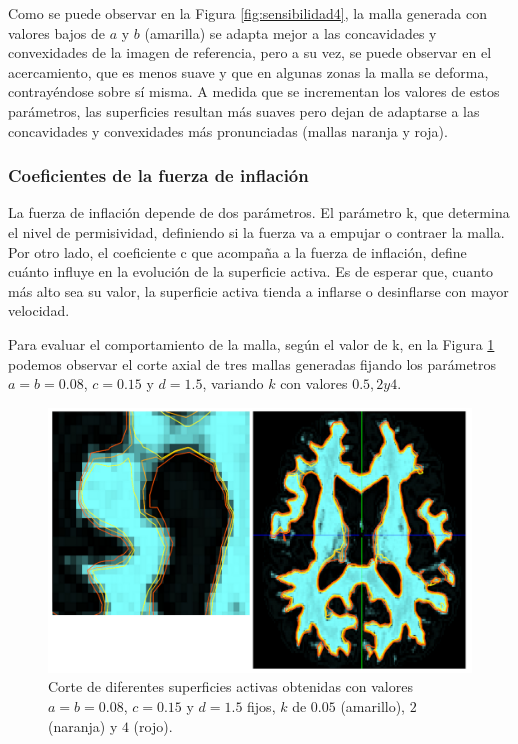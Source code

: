 Como se puede observar en la Figura \ref{fig:sensibilidad4}, la malla generada con valores bajos de $a$ y $b$ (amarilla) se adapta mejor a las concavidades y convexidades de la imagen de referencia, pero a su vez, se puede observar en el acercamiento, que es menos suave y que en algunas zonas la malla se deforma, contrayéndose sobre sí misma. A medida que se incrementan los valores de estos parámetros, las superficies resultan más suaves pero dejan de adaptarse a las concavidades y convexidades más pronunciadas (mallas naranja y roja). 

\subsubsection{Coeficientes de la fuerza de inflación}
La fuerza de inflación depende de dos parámetros. El parámetro k, que determina el nivel de permisividad, definiendo si la fuerza va a empujar o contraer la malla. Por otro lado,  el coeficiente c que acompaña a la fuerza de inflación, define  cuánto influye en la evolución de la superficie activa. Es de esperar que, cuanto más alto sea su valor, la superficie activa tienda a inflarse o desinflarse con mayor velocidad.

Para evaluar el comportamiento de la malla, según el valor de k, en la Figura \ref{fig:sensibilidad8} podemos observar el corte axial de tres mallas generadas fijando los parámetros $a=b=0.08$, $c=0.15$ y $d=1.5$, variando $k$ con valores $0.5, 2 y 4$.

\begin{figure}[H]
	\centering
	\includegraphics[scale=0.05]{images/sensibilidad8.jpg}
	\caption{Corte de diferentes superficies activas obtenidas con valores $a=b=0.08$, $c=0.15$ y $d=1.5$ fijos,  $k$ de $0.05$ (amarillo), $2$ (naranja) y $4$ (rojo). }
	\label{fig:sensibilidad8}
\end{figure}

